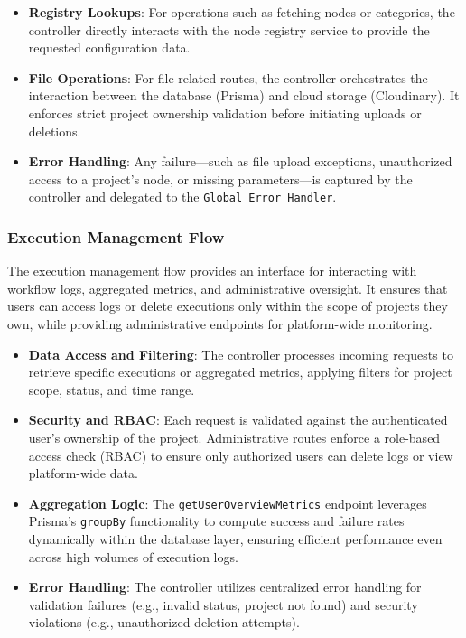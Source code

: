\begin{itemize}
    \item \textbf{Registry Lookups}: For operations such as fetching nodes or categories, the controller directly interacts with the node registry service to provide the requested configuration data.
    \item \textbf{File Operations}: For file-related routes, the controller orchestrates the interaction between the database (Prisma) and cloud storage (Cloudinary). It enforces strict project ownership validation before initiating uploads or deletions.
    \item \textbf{Error Handling}: Any failure—such as file upload exceptions, unauthorized access to a project's node, or missing parameters—is captured by the controller and delegated to the \texttt{Global Error Handler}.
\end{itemize}

\subsubsection{Execution Management Flow}

The execution management flow provides an interface for interacting with workflow logs, aggregated metrics, and administrative oversight. It ensures that users can access logs or delete executions only within the scope of projects they own, while providing administrative endpoints for platform-wide monitoring.


\begin{itemize}
    \item \textbf{Data Access and Filtering}: The controller processes incoming requests to retrieve specific executions or aggregated metrics, applying filters for project scope, status, and time range.
    \item \textbf{Security and RBAC}: Each request is validated against the authenticated user's ownership of the project. Administrative routes enforce a role-based access check (RBAC) to ensure only authorized users can delete logs or view platform-wide data.
    \item \textbf{Aggregation Logic}: The \texttt{getUserOverviewMetrics} endpoint leverages Prisma's \texttt{groupBy} functionality to compute success and failure rates dynamically within the database layer, ensuring efficient performance even across high volumes of execution logs.
    \item \textbf{Error Handling}: The controller utilizes centralized error handling for validation failures (e.g., invalid status, project not found) and security violations (e.g., unauthorized deletion attempts).
\end{itemize}

